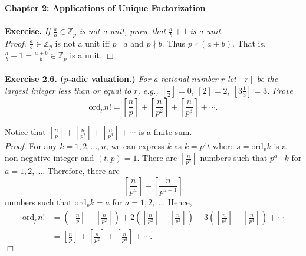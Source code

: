 \documentclass{article}
\begin{document}
\textbf{\Large Chapter 2: Applications of Unique Factorization} \\\\



\textbf{Exercise.}
\emph{If $\frac{a}{b} \in \mathbb{Z}_{p}$ is not a unit, prove that
$\frac{a}{b} + 1$ is a unit.} \\

\emph{Proof.}
$\frac{a}{b} \in \mathbb{Z}_{p}$ is not a unit iff $p \mid a$ and $p \nmid b$.
Thus $p \nmid (a +b)$. That is, $\frac{a}{b} + 1 = \frac{a + b}{b} \in \mathbb{Z}_{p}$ is a unit.
$\Box$ \\\\



\textbf{Exercise 2.6. ($p$-adic valuation.)}
\emph{For a rational number $r$ let $[r]$ be the largest integer less than or equal to $r$,
e.g., $[\frac{1}{2}] = 0$, $[2] = 2$, $[3 \frac{1}{3}] = 3$. Prove
$$\text{ord}_p n!
= \left[\frac{n}{p}\right] + \left[\frac{n}{p^2}\right] + \left[\frac{n}{p^3}\right] + \cdots.$$
}

Notice that $[\frac{n}{p}] + [\frac{n}{p^2}] + [\frac{n}{p^3}] + \cdots$ is a finite sum. \\

\emph{Proof.}
For any $k = 1, 2, ..., n$, we can express $k$ as $k = p^s t$
where $s = \text{ord}_p k$ is a non-negative integer and $(t, p) = 1$.
There are $[\frac{n}{p^a}]$ numbers such that $p^a \mid k$ for $a = 1, 2, ...$.
Therefore, there are $$\left[\frac{n}{p^a}\right] - \left[\frac{n}{p^{a+1}}\right]$$
numbers such that $\text{ord}_p k = a$ for $a = 1, 2, ...$. Hence,
\begin{align*}
\text{ord}_p n!
&= \left( \left[\frac{n}{p}\right] - \left[\frac{n}{p^2}\right] \right)
 + 2 \left( \left[\frac{n}{p^2}\right] - \left[\frac{n}{p^3}\right] \right)
 + 3 \left( \left[\frac{n}{p^3}\right] - \left[\frac{n}{p^4}\right] \right) + \cdots \\
&= \left[\frac{n}{p}\right] + \left[\frac{n}{p^2}\right] + \left[\frac{n}{p^3}\right] + \cdots.
\end{align*}
$\Box$ \\
\end{document}
